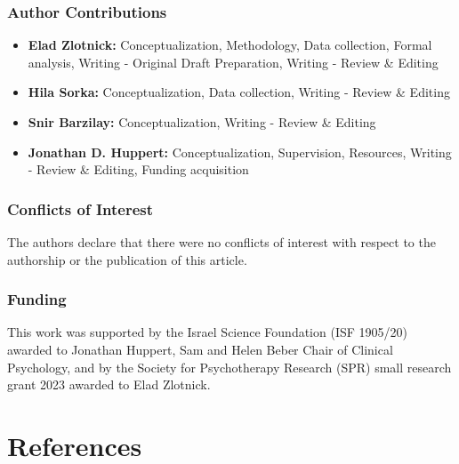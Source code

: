 \documentclass[
  man,floatsintext]{apa7}
\providecommand{\tightlist}{%
  \setlength{\itemsep}{0pt}\setlength{\parskip}{0pt}}
\begin{document}
\newpage

\subsubsection{Author Contributions}\label{author-contributions}

\begin{itemize}
\tightlist
\item
  \textbf{Elad Zlotnick:} Conceptualization, Methodology, Data collection, Formal analysis, Writing - Original Draft Preparation, Writing - Review \& Editing
\item
  \textbf{Hila Sorka:} Conceptualization, Data collection, Writing - Review \& Editing
\item
  \textbf{Snir Barzilay:} Conceptualization, Writing - Review \& Editing
\item
  \textbf{Jonathan D. Huppert:} Conceptualization, Supervision, Resources, Writing - Review \& Editing, Funding acquisition
\end{itemize}

\subsubsection{Conflicts of Interest}\label{conflicts-of-interest}

The authors declare that there were no conflicts of interest with respect to the authorship or the publication of this article.

\subsubsection{Funding}\label{funding}

This work was supported by the Israel Science Foundation (ISF 1905/20) awarded to Jonathan Huppert, Sam and Helen Beber Chair of Clinical Psychology, and by the Society for Psychotherapy Research (SPR) small research grant 2023 awarded to Elad Zlotnick.

\newpage

\section{References}\label{references}
\end{document}
